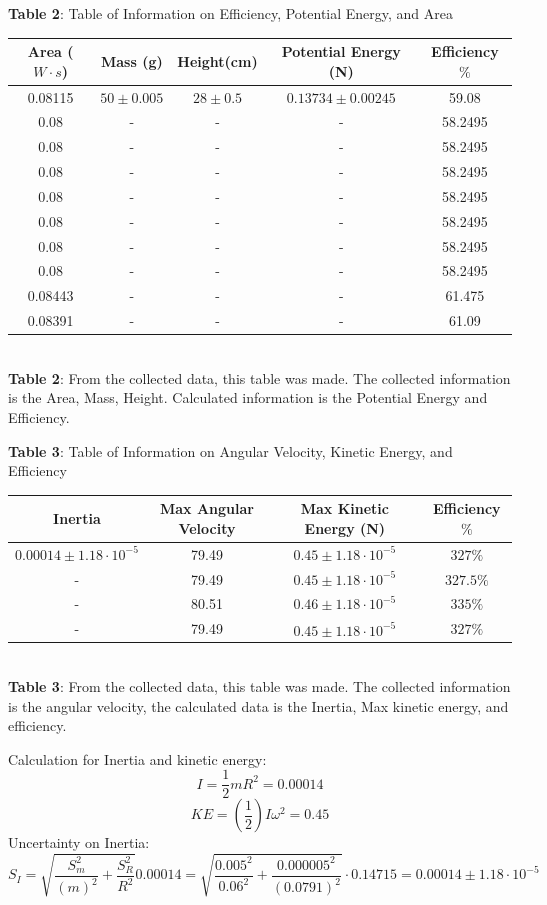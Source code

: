 \documentclass[11pt]{article}
\begin{document}
\begin{center}
\caption{\textbf{Table 2}: Table of Information on Efficiency, Potential Energy, and Area} 
 \begin{tabular}{||c c c c c||} 
 \hline
 Area ($W\cdot s$) & Mass (g) & Height(cm) & Potential Energy (N) & Efficiency $\%$\\ [0.5ex] 
 \hline\hline
 0.08115 & $50\pm0.005$  & $28\pm0.5$ & $0.13734\pm0.00245$ & 59.08\\ 
 \hline
 0.08 & - & - & - & 58.2495 \\
 \hline
 0.08 & - & - & - & 58.2495\\
 \hline
 0.08 & - & - & - & 58.2495 \\
 \hline
 0.08 & - & - & - & 58.2495 \\
 \hline
 0.08 & - & - & - & 58.2495 \\
 \hline
 0.08 & - & - & - & 58.2495 \\
 \hline
 0.08 & - & - & - & 58.2495 \\
 \hline
 0.08443 & - & - & - & 61.475\\
 \hline
 0.08391 & - & - & - & 61.09 \\ [1ex] 
 \hline
\end{tabular}
\\\textbf{Table 2}: From the collected data, this table was made. The collected information is the Area, Mass, Height. Calculated information is the Potential Energy and Efficiency.
\end{center}
\newpage
\begin{center}
\caption{\textbf{Table 3}: Table of Information on Angular Velocity, Kinetic Energy, and Efficiency} 
 \begin{tabular}{||c c c c||} 
 \hline
 Inertia & Max Angular Velocity & Max Kinetic Energy (N) & Efficiency $\%$\\ [0.5ex] 
 \hline\hline
 $0.00014\pm 1.18\cdot10^{-5}$ & 79.49  & $0.45\pm 1.18\cdot10^{-5}$ & $327\%$\\ 
 \hline
 - & 79.49 & $0.45\pm 1.18\cdot10^{-5}$ & $327.5\%$\\
 \hline
 - & 80.51 & $0.46\pm 1.18\cdot10^{-5}$ & $335\%$\\
 \hline
 - & 79.49 & $$0.45\pm 1.18\cdot10^{-5}$$ & $327\%$ \\[1ex] 
 \hline
\end{tabular}
\\\textbf{Table 3}: From the collected data, this table was made. The collected information is the angular velocity, the calculated data is the Inertia, Max kinetic energy, and efficiency.
\end{center}
Calculation for Inertia and kinetic energy:
\[I=\frac{1}{2}mR^2=0.00014\]
\[KE=(\frac{1}{2})I\omega^2=0.45\]
Uncertainty on Inertia:
\[S_{I}=\sqrt{\frac{S_m^2}{(m)^2}+\frac{S_R^2}{R^2}}0.00014=\sqrt{\frac{0.005^2}{0.06^2}+\frac{0.000005^2}{(0.0791)^2}}\cdot 0.14715=0.00014\pm1.18\cdot10^{-5}\]
\end{document}
